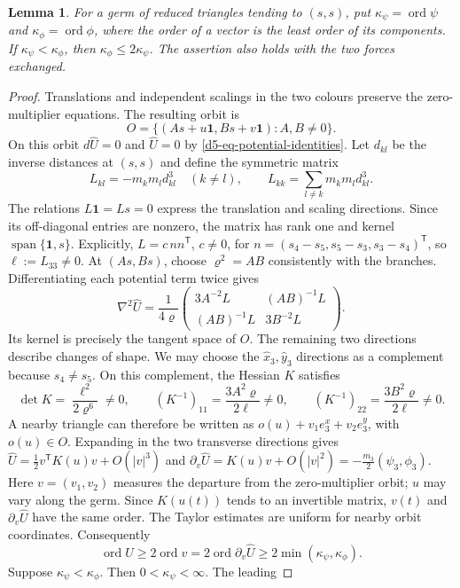 \documentclass[Threeside,11pt]{article}
\newtheorem{lemma}[theorem]{Lemma}
\theoremstyle{definition}
\theoremstyle{remark}
\numberwithin{equation}{section}
\theoremstyle{remark}
\newcommand{\ord}{\operatorname{ord}}
\begin{document}
{\begin{lemma}\label{d5-lem-mb}
For a germ of reduced triangles tending to $(s,s)$, put
$\kappa_\psi=\ord\psi$ and $\kappa_\phi=\ord\phi$, where the order of a vector is
the least order of its components.  If $\kappa_\psi<\kappa_\phi$, then
$\kappa_\phi\le2\kappa_\psi$.  The assertion also holds with the two forces
exchanged.
\end{lemma}
\begin{proof}
Translations and independent scalings in the two colours preserve the
zero-multiplier equations.  The resulting orbit is
\[
 O=\{(As+u\mathbf1,Bs+v\mathbf1):A,B\ne0\}.
\]
On this orbit $d\widehat U=0$ and $\widehat U=0$ by
\eqref{d5-eq-potential-identities}.  Let $d_{kl}$ be the inverse distances at
$(s,s)$ and define the symmetric matrix
\[
 L_{kl}=-m_km_ld_{kl}^3\quad(k\ne l),\qquad
 L_{kk}=\sum_{l\ne k}m_km_ld_{kl}^3.
\]
The relations $L\mathbf1=Ls=0$ express the translation and scaling
directions.  Since its off-diagonal entries are nonzero, the matrix has
rank one and kernel $\operatorname{span}\{\mathbf1,s\}$.  Explicitly,
$L=c\,nn^{\mathsf T}$, $c\ne0$, for
$n=(s_4-s_5,s_5-s_3,s_3-s_4)^{\mathsf T}$, so $\ell:=L_{33}\ne0$.
At $(As,Bs)$, choose $\varrho^2=AB$ consistently with the branches.  Differentiating
each potential term twice gives
\[
 \nabla^2\widehat U=\frac1{4\varrho}
 \begin{pmatrix}3A^{-2}L&(AB)^{-1}L\\(AB)^{-1}L&3B^{-2}L\end{pmatrix}.
\]
Its kernel is precisely the tangent space of $O$.  The remaining two
directions describe changes of shape.  We may choose the $\hat x_3,\hat y_3$
directions as a complement because $s_4\ne s_5$.  On this complement, the
Hessian $K$ satisfies
\[
 \det K=\frac{\ell^2}{2\varrho^6}\ne0,\qquad
 (K^{-1})_{11}=\frac{3A^2\varrho}{2\ell}\ne0,
 \qquad (K^{-1})_{22}=\frac{3B^2\varrho}{2\ell}\ne0.
\]
A nearby triangle can therefore be written as
$o(u)+v_1e_3^x+v_2e_3^y$, with $o(u)\in O$.
Expanding in the two transverse directions gives
$\widehat U=\frac12v^{\mathsf T}K(u)v+O(|v|^3)$ and
$\partial_v\widehat U=K(u)v+O(|v|^2)=-\frac{m_3}{2}(\psi_3,\phi_3)$.
Here $v=(v_1,v_2)$ measures the departure from the zero-multiplier orbit;
$u$ may vary along the germ.  Since $K(u(t))$ tends to an invertible matrix,
$v(t)$ and $\partial_v\widehat U$ have the same order.  The Taylor estimates
are uniform for nearby orbit coordinates.
Consequently
\[
 \ord\widehat U\ge2\ord v
 =2\ord\partial_v\widehat U\ge2\min(\kappa_\psi,\kappa_\phi).
\]
Suppose $\kappa_\psi<\kappa_\phi$.  Then $0<\kappa_\psi<\infty$.  The leading

\end{proof}}
\end{document}
